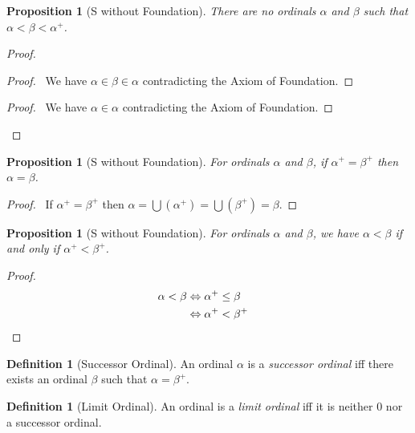 \documentclass{book}
\let\qed\relax
\newtheorem{prop}[ax]{Proposition}
\theoremstyle{definition}
\newtheorem{df}[ax]{Definition}
\begin{document}
\begin{prop}[S without Foundation]
There are no ordinals $\alpha$ and $\beta$ such that $\alpha < \beta < \alpha^+$.
\end{prop}

\begin{proof}
\pf
{}
\begin{proof}
	\pf\ We have $\alpha \in \beta \in \alpha$ contradicting the Axiom of Foundation.
\end{proof}
\begin{proof}
	\pf\ We have $\alpha \in \alpha$ contradicting the Axiom of Foundation.
\end{proof}
\qed
\end{proof}

\begin{prop}[S without Foundation]
\label{prop:Peano2}
For ordinals $\alpha$ and $\beta$, if $\alpha^+ = \beta^+$ then $\alpha = \beta$.
\end{prop}

\begin{proof}
	\pf\ If $\alpha^+ = \beta^+$ then $\alpha = \bigcup (\alpha^+) = \bigcup (\beta^+) = \beta$. \qed
\end{proof}

\begin{prop}[S without Foundation]
\label{prop:succltsucc}
For ordinals $\alpha$ and $\beta$, we have $\alpha < \beta$ if and only if $\alpha^+ < \beta^+$.
\end{prop}

\begin{proof}
\pf
\begin{align*}
\alpha < \beta & \Leftrightarrow \alpha^+ \leq \beta \\
& \Leftrightarrow \alpha^+ < \beta^+ & \qed
\end{align*}
\end{proof}

\begin{df}[Successor Ordinal]
An ordinal $\alpha$ is a \emph{successor ordinal} iff there exists an ordinal $\beta$ such that $\alpha = \beta^+$.
\end{df}

\begin{df}[Limit Ordinal]
An ordinal is a \emph{limit ordinal} iff it is neither 0 nor a successor ordinal.
\end{df}
\end{document}
